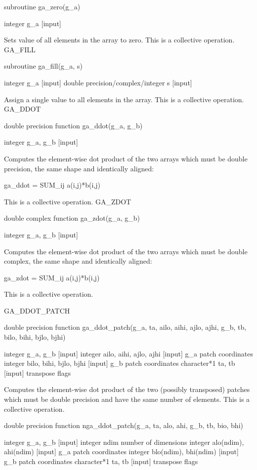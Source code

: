 subroutine ga\_zero(g\_a)

integer g\_a {[}input{]}

Sets value of all elements in the array to zero. This is a collective
operation. GA\_FILL

subroutine ga\_fill(g\_a, s)

integer g\_a {[}input{]} double precision/complex/integer s {[}input{]}

Assign a single value to all elements in the array. This is a collective
operation. GA\_DDOT

double precision function ga\_ddot(g\_a, g\_b)

integer g\_a, g\_b {[}input{]}

Computes the element-wise dot product of the two arrays which must
be double precision, the same shape and identically aligned:

ga\_ddot = SUM\_ij a(i,j){*}b(i,j)

This is a collective operation. GA\_ZDOT

double complex function ga\_zdot(g\_a, g\_b)

integer g\_a, g\_b {[}input{]}

Computes the element-wise dot product of the two arrays which must
be double complex, the same shape and identically aligned:

ga\_zdot = SUM\_ij a(i,j){*}b(i,j)

This is a collective operation.

GA\_DDOT\_PATCH

double precision function ga\_ddot\_patch(g\_a, ta, ailo, aihi, ajlo,
ajhi, g\_b, tb, bilo, bihi, bjlo, bjhi) 

integer g\_a, g\_b {[}input{]} integer ailo, aihi, ajlo, ajhi {[}input{]}
g\_a patch coordinates integer bilo, bihi, bjlo, bjhi {[}input{]}
g\_b patch coordinates character{*}1 ta, tb {[}input{]} transpose
flags

Computes the element-wise dot product of the two (possibly transposed)
patches which must be double precision and have the same number of
elements. This is a collective operation.

double precision function nga\_ddot\_patch(g\_a, ta, alo, ahi, g\_b,
tb, bio, bhi) 

integer g\_a, g\_b {[}input{]} integer ndim number of dimensions integer
alo(ndim), ahi(ndim) {[}input{]} g\_a patch coordinates integer blo(ndim),
bhi(ndim) {[}input{]} g\_b patch coordinates character{*}1 ta, tb
{[}input{]} transpose flags

